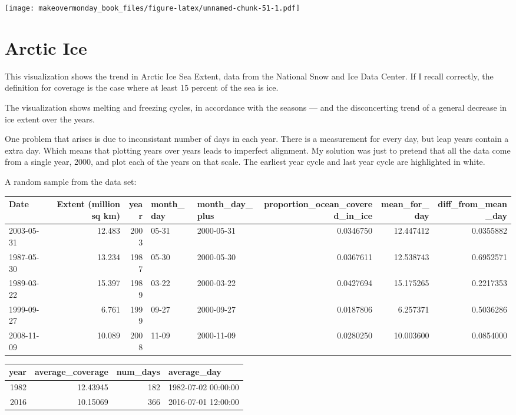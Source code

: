 \documentclass[]{book}
\theoremstyle{definition}
\theoremstyle{definition}
\theoremstyle{definition}
\theoremstyle{remark}
\begin{document}
\texttt{[image: makeovermonday\_book\_files/figure-latex/unnamed-chunk-51-1.pdf]}

\chapter{Arctic Ice}\label{arctic-ice}

This visualization shows the trend in Arctic Ice Sea Extent, data from
the National Snow and Ice Data Center. If I recall correctly, the
definition for coverage is the case where at least 15 percent of the sea
is ice.

The visualization shows melting and freezing cycles, in accordance with
the seasons --- and the disconcerting trend of a general decrease in ice
extent over the years.

One problem that arises is due to inconsistant number of days in each
year. There is a measurement for every day, but leap years contain a
extra day. Which means that plotting years over years leads to imperfect
alignment. My solution was just to pretend that all the data come from a
single year, 2000, and plot each of the years on that scale. The
earliest year cycle and last year cycle are highlighted in white.

A random sample from the data set:

\begin{tabular}{l|r|r|l|l|r|r|r}
\hline
Date & Extent (million sq km) & year & month\_day & month\_day\_plus & proportion\_ocean\_covered\_in\_ice & mean\_for\_day & diff\_from\_mean\_day\\
\hline
2003-05-31 & 12.483 & 2003 & 05-31 & 2000-05-31 & 0.0346750 & 12.447412 & 0.0355882\\
\hline
1987-05-30 & 13.234 & 1987 & 05-30 & 2000-05-30 & 0.0367611 & 12.538743 & 0.6952571\\
\hline
1989-03-22 & 15.397 & 1989 & 03-22 & 2000-03-22 & 0.0427694 & 15.175265 & 0.2217353\\
\hline
1999-09-27 & 6.761 & 1999 & 09-27 & 2000-09-27 & 0.0187806 & 6.257371 & 0.5036286\\
\hline
2008-11-09 & 10.089 & 2008 & 11-09 & 2000-11-09 & 0.0280250 & 10.003600 & 0.0854000\\
\hline
\end{tabular}

\begin{tabular}{r|r|r|l}
\hline
year & average\_coverage & num\_days & average\_day\\
\hline
1982 & 12.43945 & 182 & 1982-07-02 00:00:00\\
\hline
2016 & 10.15069 & 366 & 2016-07-01 12:00:00\\
\hline
\end{tabular}
\end{document}
